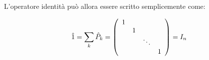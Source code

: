 L'operatore identità può allora essere scritto semplicemente come:

	\begin{equation}
		\hat{1} = \sum_k \hat{P}_k =
		\left ( \begin{array}{c c c c}
			1 & & & \\
			& 1 & & \\
			& & \ddots & \\
			& & & 1 \\
		\end{array} \right ) = I_n
	\end{equation}
